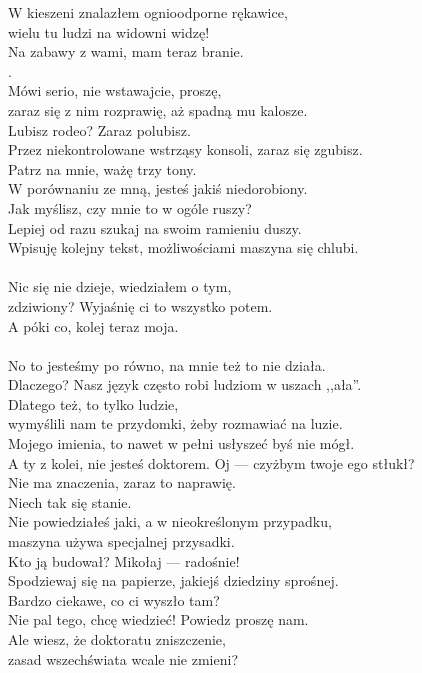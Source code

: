 \chardok{}
W kieszeni znalazłem ognioodporne rękawice,\\
wielu tu ludzi na widowni widzę!\\
Na zabawy z wami, mam teraz branie.\\
.\\

\charfer{}
Mówi serio, nie wstawajcie, proszę,\\
zaraz się z nim rozprawię, aż spadną mu kalosze.\\
Lubisz rodeo? Zaraz polubisz.\\
Przez niekontrolowane wstrząsy konsoli, zaraz się zgubisz.\\
Patrz na mnie, ważę trzy tony.\\
W porównaniu ze mną, jesteś jakiś niedorobiony.\\
Jak myślisz, czy mnie to w ogóle ruszy?\\
Lepiej od razu szukaj na swoim ramieniu duszy.\\
Wpisuję kolejny tekst, możliwościami maszyna się chlubi.\\
\\

\chardok{}
Nic się nie dzieje, wiedziałem o tym,\\
zdziwiony? Wyjaśnię ci to wszystko potem.\\
A póki co, kolej teraz moja.\\
\\

\charfer{}
No to jesteśmy po równo, na mnie też to nie działa.\\
Dlaczego? Nasz język często robi ludziom w uszach ,,ała''.\\
Dlatego też, to tylko ludzie,\\
wymyślili nam te przydomki, żeby rozmawiać na luzie.\\
Mojego imienia, to nawet w pełni usłyszeć byś nie mógł.\\
A ty z kolei, nie jesteś doktorem. Oj --- czyżbym twoje ego stłukł?\\

\chardok{}
Nie ma znaczenia, zaraz to naprawię.\\
 Niech tak się stanie.\\

\charfer{}
Nie powiedziałeś jaki, a w nieokreślonym przypadku,\\
maszyna używa specjalnej przysadki.\\
Kto ją budował? Mikołaj --- radośnie!\\
Spodziewaj się na papierze, jakiejś dziedziny sprośnej.\\
Bardzo ciekawe, co ci wyszło tam?\\
Nie pal tego, chcę wiedzieć! Powiedz proszę nam.\\
Ale wiesz, że doktoratu zniszczenie,\\
zasad wszechświata wcale nie zmieni?\\

